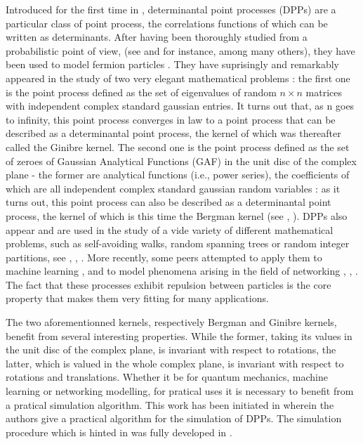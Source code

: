 \documentclass[11pt]{article}
\begin{document}
Introduced for the first time in \cite{Macchi1975}, determinantal point processes (DPPs) are a particular class of point process, the correlations functions of which can be written as determinants. After having been thoroughly studied from a probabilistic point of view, (see \cite{ShiraiTakahashi2003} and \cite{Soshnikov2000} for instance, among many others), they have been used to model fermion particles \cite{Tamura2006}. They have suprisingly and remarkably appeared in the study of two very elegant mathematical problems : the first one is the point process defined as the set of eigenvalues of random $ n \times n $ matrices with independent complex standard gaussian entries. It turns out that, as n goes to infinity, this point process converges in law to a point process that can be described \cite{Ginibre1965} as a determinantal point process, the kernel of which was thereafter called the Ginibre kernel. The second one is the point process defined as the set of zeroes of Gaussian Analytical Functions (GAF) in the unit disc of the complex plane - the former are analytical functions (i.e., power series), the coefficients of which are all independent complex standard gaussian random variables : as it turns out, this point process can also be described as a determinantal point process, the kernel of which is this time the Bergman kernel (see \cite{Hough2009ZerosGAF}, \cite{ZerosGaussianPowerSeries}). DPPs also appear and are used in the study of a vide variety of different mathematical problems, such as self-avoiding walks, random spanning trees or random integer partitions, see \cite{Burton1993}, \cite{Meliot2021}, \cite{Tao2024}. More recently, some peers attempted to apply them to machine learning \cite{DeterminantalML2013}, and to model phenomena arising in the field of networking \cite{Miyoshi2014}, \cite{TorrisiLeonardi2014}, \cite{Vergne2014}. The fact that these processes exhibit repulsion between particles is the core property that makes them very fitting for many applications.

The two aforementionned kernels, respectively Bergman and Ginibre kernels, benefit from several interesting properties. While the former, taking its values in the unit disc of the complex plane, is invariant with respect to rotations, the latter, which is valued in the whole complex plane, is invariant with respect to rotations and translations. Whether it be for quantum mechanics, machine learning or networking modelling, for pratical uses it is necessary to benefit from a pratical simulation algorithm. This work has been initiated in \cite{Hough2006} wherein the authors give a practical algorithm for the simulation of DPPs. The simulation procedure which is hinted in \cite{Ginibre1965} was fully developed in \cite{Caer1990}.
\end{document}
